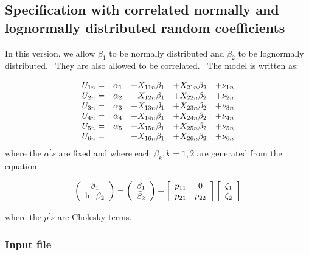 \documentclass[12pt]{memoir}
\begin{document}
\subsection{Specification with correlated normally and lognormally distributed
random coefficients}

In this version, we allow $\beta_{1}$ to be normally distributed and
$\beta_{2}$ to be lognormally distributed. \ They are also allowed to be
correlated. \ The model is written as:%

\begin{equation}%
\begin{array}
[c]{ccccc}%
U_{1n}= & \alpha_{1} & +X_{11n}\beta_{1} & +X_{21n}\beta_{2} & +\nu_{1n}\\
U_{2n}= & \alpha_{2} & +X_{12n}\beta_{1} & +X_{22n}\beta_{2} & +\nu_{2n}\\
U_{3n}= & \alpha_{3} & +X_{13n}\beta_{1} & +X_{23n}\beta_{2} & +\nu_{3n}\\
U_{4n}= & \alpha_{4} & +X_{14n}\beta_{1} & +X_{24n}\beta_{2} & +\nu_{4n}\\
U_{5n}= & \alpha_{5} & +X_{15n}\beta_{1} & +X_{25n}\beta_{2} & +\nu_{5n}\\
U_{6n}= &  & +X_{16n}\beta_{1} & +X_{26n}\beta_{2} & +\nu_{6n}%
\end{array}
\end{equation}
where the $\alpha^{\prime}s$ are fixed and where each $\beta_{k},k=1,2$ are
generated from the equation:%

\begin{equation}
\left(
\begin{array}
[c]{c}%
\beta_{1}\\
\ln\;\beta_{2}%
\end{array}
\right)  =\left(
\begin{array}
[c]{c}%
\bar{\beta}_{1}\\
\bar{\beta}_{2}%
\end{array}
\right)  +\left[
\begin{array}
[c]{cc}%
p_{11} & 0\\
p_{21} & p_{22}%
\end{array}
\right]  \left[
\begin{array}
[c]{c}%
\zeta_{1}\\
\zeta_{2}%
\end{array}
\right]
\end{equation}


where the $p^{\prime}s$ are Cholesky terms. \ 

\subsubsection{Input file}
\end{document}
